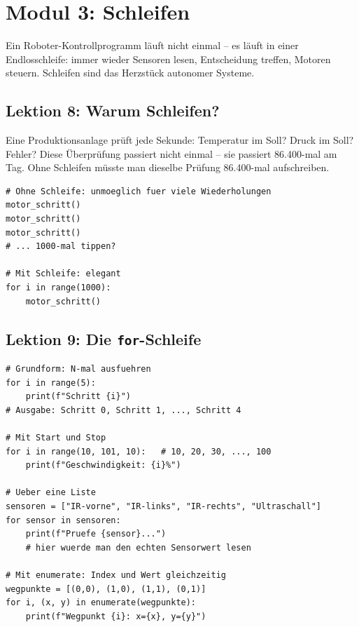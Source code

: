 \chapter{Modul 3: Schleifen}

Ein Roboter-Kontrollprogramm läuft nicht einmal -- es läuft in einer Endlosschleife: immer wieder Sensoren lesen, Entscheidung treffen, Motoren steuern. Schleifen sind das Herzstück autonomer Systeme.

\section{Lektion 8: Warum Schleifen?}

\begin{analogie}
Eine Produktionsanlage prüft jede Sekunde: Temperatur im Soll? Druck im Soll? Fehler? Diese Überprüfung passiert nicht einmal -- sie passiert 86.400-mal am Tag. Ohne Schleifen müsste man dieselbe Prüfung 86.400-mal aufschreiben.
\end{analogie}

\begin{lstlisting}
# Ohne Schleife: unmoeglich fuer viele Wiederholungen
motor_schritt()
motor_schritt()
motor_schritt()
# ... 1000-mal tippen?

# Mit Schleife: elegant
for i in range(1000):
    motor_schritt()
\end{lstlisting}

\section{Lektion 9: Die \texttt{for}-Schleife}

\begin{lstlisting}
# Grundform: N-mal ausfuehren
for i in range(5):
    print(f"Schritt {i}")
# Ausgabe: Schritt 0, Schritt 1, ..., Schritt 4

# Mit Start und Stop
for i in range(10, 101, 10):   # 10, 20, 30, ..., 100
    print(f"Geschwindigkeit: {i}%")

# Ueber eine Liste
sensoren = ["IR-vorne", "IR-links", "IR-rechts", "Ultraschall"]
for sensor in sensoren:
    print(f"Pruefe {sensor}...")
    # hier wuerde man den echten Sensorwert lesen

# Mit enumerate: Index und Wert gleichzeitig
wegpunkte = [(0,0), (1,0), (1,1), (0,1)]
for i, (x, y) in enumerate(wegpunkte):
    print(f"Wegpunkt {i}: x={x}, y={y}")
\end{lstlisting}

